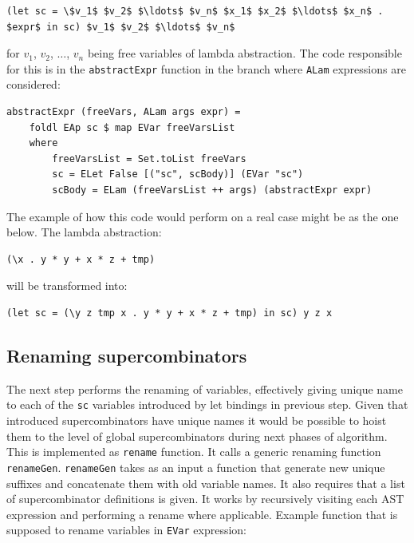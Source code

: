 \documentclass[12pt,a4paper]{report}
\begin{document}
\vspace*{0.2in}
\begin{lstlisting}[style=haskell,mathescape=true]
(let sc = \$v_1$ $v_2$ $\ldots$ $v_n$ $x_1$ $x_2$ $\ldots$ $x_n$ . $expr$ in sc) $v_1$ $v_2$ $\ldots$ $v_n$
\end{lstlisting}

for $v_1$, $v_2$, $\ldots$, $v_n$ being free variables of lambda abstraction.
The code responsible for this is in the \texttt{abstractExpr} function in the
branch where \texttt{ALam} expressions are considered:

\vspace*{0.2in}
\begin{lstlisting}[style=haskell]
abstractExpr (freeVars, ALam args expr) =
    foldl EAp sc $ map EVar freeVarsList
    where
        freeVarsList = Set.toList freeVars
        sc = ELet False [("sc", scBody)] (EVar "sc")
        scBody = ELam (freeVarsList ++ args) (abstractExpr expr)
\end{lstlisting}

The example of how this code would perform on a real case might be as the one
below. The lambda abstraction:

\vspace*{0.2in}
\begin{lstlisting}[style=haskell]
(\x . y * y + x * z + tmp)
\end{lstlisting}

will be transformed into:

\vspace*{0.2in}
\begin{lstlisting}[style=haskell]
(let sc = (\y z tmp x . y * y + x * z + tmp) in sc) y z x
\end{lstlisting}

\subsection{Renaming supercombinators}
The next step performs the renaming of variables, effectively giving unique
name to each of the \texttt{sc} variables introduced by let bindings
in previous step. Given that introduced supercombinators have unique names it
would be possible to hoist them to the level of global supercombinators during
next phases of algorithm. This is implemented as \texttt{rename} function. It
calls a generic renaming function \texttt{renameGen}. \texttt{renameGen} takes
as an input a function that generate new unique suffixes and concatenate them
with old variable names. It also requires that a list of supercombinator
definitions is given. It works by recursively visiting each AST expression and
performing a rename where applicable. Example function that is supposed to
rename variables in \texttt{EVar} expression:
\end{document}
